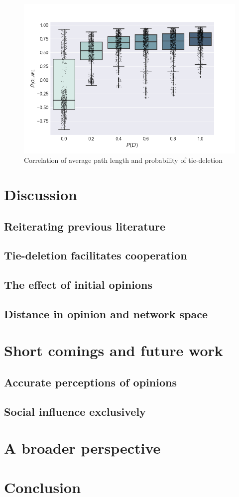 \documentclass{article}
\begin{document}
\begin{figure}[H]
    \centering
    \includegraphics[width=.8\linewidth]{../plots/overall/Tie_Dissolution_Correlations_Boxplot_Full.png}
  \caption{Correlation of average path length and probability of tie-deletion}
  \label{fig:sfig1}
\end{figure}

\section{Discussion}

\subsection{Reiterating previous literature}

\subsection{Tie-deletion facilitates cooperation}

\subsection{The effect of initial opinions}

\subsection{Distance in opinion and network space}

\section{Short comings and future work}

\subsection{Accurate perceptions of opinions}

\subsection{Social influence exclusively}

\section{A broader perspective}

\section{Conclusion}




\end{document}
